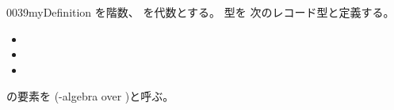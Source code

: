 \documentclass[index]{subfiles}
\begin{document}
\begin{myBlock}{0039}{myDefinition}
  を階数、
  を\myInlineMath{\myNat}代数とする。
  型を
  次のレコード型と定義する。
  \begin{itemize}
  \item {}
  \item {}
  \item {}
  \end{itemize}
  の要素を
  (\myInlineMath{\myNat}-algebra over )と呼ぶ。
\end{myBlock}
\end{document}
